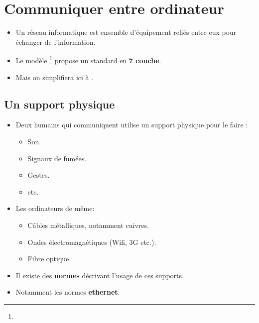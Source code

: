 \section{Communiquer entre ordinateur} %
\begin{frame}
	\begin{itemize}
		\item Un réseau informatique est ensemble d'équipement reliés entre eux pour échanger de l'information.
		\item Le modèle \footnote{} propose un standard en \textbf{7 couche}.
		\item Mais on simplifiera ici à .
		
	\end{itemize}
\end{frame}
\subsection{Un support physique}

\begin{frame}
	\begin{itemize}
		\item Deux humains qui communiquent utilise un support physique pour le faire : 			\begin{itemize}
				\item Son. 
				\item Signaux de fumées.
				\item Gestes.
				\item etc.
			\end{itemize}
		\item Les ordinateurs de même:
			\begin{itemize}
				\item Câbles métalliques, notamment cuivres.
				\item Ondes électromagnétiques (Wifi, 3G etc.).
				\item Fibre optique. %
			\end{itemize} 
		\item Il existe des \textbf{normes} décrivant l'usage de ces supports.
		\item Notamment les normes \textbf{ethernet}.
	\end{itemize}
\end{frame}
